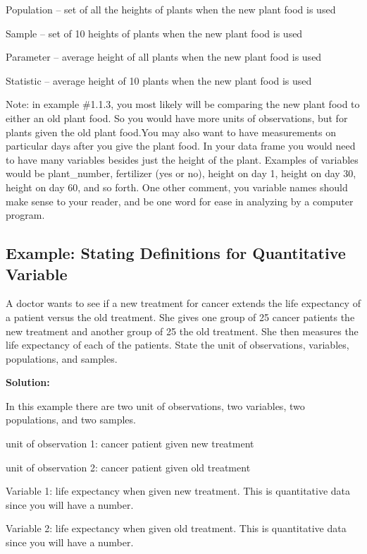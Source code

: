 \documentclass[]{book}
\begin{document}
Population -- set of all the heights of plants when the new plant food is used

Sample -- set of 10 heights of plants when the new plant food is used

Parameter -- average height of all plants when the new plant food is used

Statistic -- average height of 10 plants when the new plant food is used

Note: in example \#1.1.3, you most likely will be comparing the new plant food to either an old plant food. So you would have more units of observations, but for plants given the old plant food.You may also want to have measurements on particular days after you give the plant food. In your data frame you would need to have many variables besides just the height of the plant. Examples of variables would be plant\_number, fertilizer (yes or no), height on day 1, height on day 30, height on day 60, and so forth. One other comment, you variable names should make sense to your reader, and be one word for ease in analyzing by a computer program.

\hypertarget{example-stating-definitions-for-quantitative-variable-1}{%
\subsection{Example: Stating Definitions for Quantitative Variable}\label{example-stating-definitions-for-quantitative-variable-1}}

A doctor wants to see if a new treatment for cancer extends the life expectancy of a patient versus the old treatment. She gives one group of 25 cancer patients the new treatment and another group of 25 the old treatment. She then measures the life expectancy of each of the patients. State the unit of observations, variables, populations, and samples.

\textbf{Solution:}

In this example there are two unit of observations, two variables, two populations, and two samples.

unit of observation 1: cancer patient given new treatment

unit of observation 2: cancer patient given old treatment

Variable 1: life expectancy when given new treatment. This is quantitative data since you will have a number.

Variable 2: life expectancy when given old treatment. This is quantitative data since you will have a number.
\end{document}
